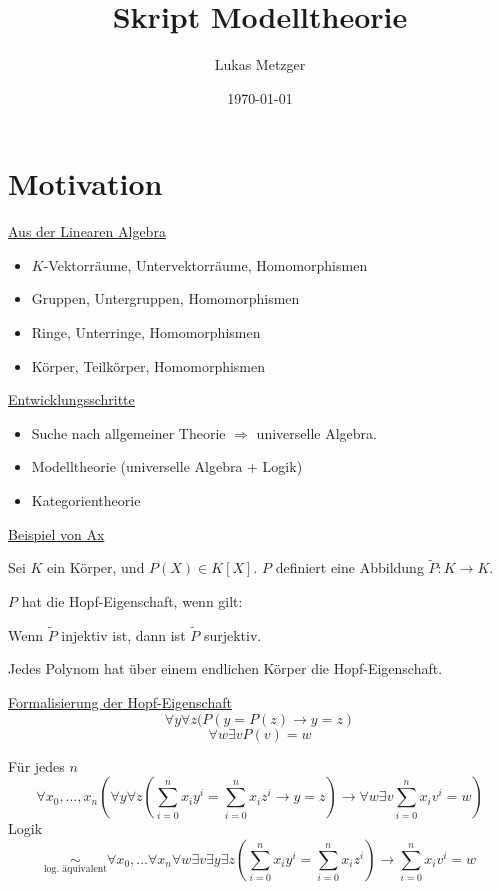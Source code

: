 \documentclass[12pt,parskip=full]{scrartcl}
\title{Skript Modelltheorie}
\author{Lukas Metzger}
\date{\today}
\newcommand{\heading}{\underline}
\theoremstyle{definition}
\begin{document}
	\maketitle
	
	\setcounter{section}{-1}
	\section{Motivation}
	
	\heading{Aus der Linearen Algebra}
	\begin{itemize}
		\item $K$-Vektorräume, Untervektorräume, Homomorphismen
		\item Gruppen, Untergruppen, Homomorphismen
		\item Ringe, Unterringe, Homomorphismen
		\item Körper, Teilkörper, Homomorphismen
	\end{itemize}

	\heading{Entwicklungsschritte}
	\begin{itemize}
		\item Suche nach allgemeiner Theorie $\Rightarrow$ universelle Algebra.
		\item Modelltheorie (universelle Algebra + Logik)
		\item Kategorientheorie
	\end{itemize}

	\heading{Beispiel von Ax}
	
	Sei $K$ ein Körper, und $P(X) \in K[X]$. $P$ definiert eine Abbildung $\tilde{P}: K \to K$.
	
	$P$ hat die Hopf-Eigenschaft, wenn gilt:
	\begin{center}
		Wenn $\tilde{P}$ injektiv ist, dann ist $\tilde{P}$ surjektiv.
	\end{center}

	Jedes Polynom hat über einem endlichen Körper die Hopf-Eigenschaft.
	
	\heading{Formalisierung der Hopf-Eigenschaft}
	\begin{equation*}
		\forall y \forall z (P(y = P(z) \rightarrow y = z)
	\end{equation*}
	\begin{equation*}
		\forall w \exists v P(v) = w
	\end{equation*}
	
	Für jedes $n$
	\begin{equation*}
		\forall x_0, \dots, x_n \left(\forall y \forall z \left(\sum_{i=0}^{n} x_i y^i = \sum_{i=0}^n x_i z^i \rightarrow y = z\right) \rightarrow \forall w \exists v \sum_{i=0}^n x_i v^i = w\right)
	\end{equation*}
	Logik
	\begin{equation*}
		\underset{\text{log. äquivalent}}{\sim} \forall x_0, \dots \forall x_n \forall w \exists v \exists y \exists z \left( \sum_{i=0}^{n} x_i y^i = \sum_{i=0}^n x_i z^i \right) \rightarrow \sum_{i=0}^n x_i v^i = w
	\end{equation*}
	
\end{document}

